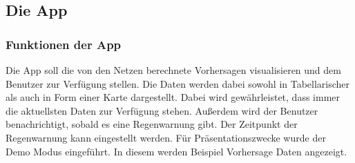 \subsection{Die App}\label{die app}

\subsubsection{Funktionen der App}\label{funkionen der app}
Die App soll die von den Netzen berechnete Vorhersagen visualisieren und dem Benutzer zur Verfügung stellen. Die Daten werden dabei sowohl in 
Tabellarischer als auch in Form einer Karte dargestellt. Dabei wird gewährleistet, dass immer die aktuellsten Daten zur Verfügung stehen. 
Außerdem wird der Benutzer benachrichtigt, sobald es eine Regenwarnung gibt. Der Zeitpunkt der Regenwarnung kann eingestellt werden.
Für Präsentationszwecke wurde der Demo Modus eingeführt. In diesem werden Beispiel Vorhersage Daten angezeigt.

